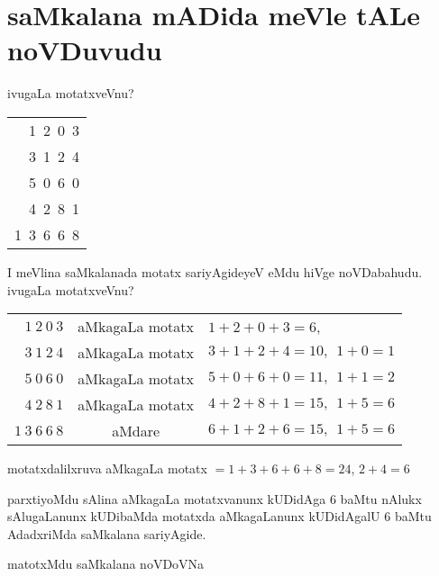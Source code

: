 \chapter{saMkalana mADida meVle tALe noVDuvudu}

\qquad ivugaLa motatxveVnu?

\begin{tabular}{r}
{\rm 1~2~0~3}\\
{\rm 3~1~2~4}\\
{\rm 5~0~6~0}\\
{\rm 4~2~8~1}\\\cline{1-1}
{\rm 1~3~6~6~8}
\end{tabular}

\smallskip

I meVlina saMkalanada motatx sariyAgideyeV eMdu hiVge noVDabahudu. ivugaLa motatxveVnu?

\smallskip

\begin{tabular}{rcl}
$1~ 2~ 0~  3$ & aMkagaLa motatx & $1+2+0+3=6$,\\
$3~1~2~4$ & aMkagaLa motatx & $3+1+2+4=10,~~ 1+0=1$\\
$5~0~6~0$ & aMkagaLa motatx & $5+0+6+0=11, ~~ 1+1=2$\\
$4~2~8~1$ & aMkagaLa motatx & $4+2+8+1=15, ~~ 1+5=6$\\\cline{1-1}\cline{3-3}
$1~3~6~6~8$ & aMdare & $6+1+2+6=15,~~ 1+5=6$ 
\end{tabular}

\smallskip

motatxdalilxruva aMkagaLa motatx $= 1+3+6+6+8=24$, $2+4=6$

\eject

parxtiyoMdu sAlina aMkagaLa motatxvanunx kUDidAga $6$ baMtu nAlukx sAlugaLanunx kUDibaMda motatxda aMkagaLanunx kUDidAgalU $6$ baMtu AdadxriMda saMkalana sariyAgide.



matotxMdu saMkalana noVDoVNa

\smallskip

{\fontsize{11}{13}}


